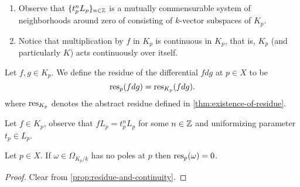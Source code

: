 \begin{remark}\label{rem:mutually-commensurable-system}
\begin{enumerate}[label = (\alph*)]
	\item Observe that $\{t_{p}^{n}L_{p}\}_{n\in {\mathbb Z}}$ is a mutually commensurable system of neighborhoods around zero of consisting of $k$-vector subspaces of $K_{p}$. 
	\item Notice that multiplication by $f$ in $K_{p}$ is continuous in $K_{p}$, that is, $K_{p}$ (and particularly $K$) acts continuously over itself.
\end{enumerate}
\begin{definition}\label{def:residue-at-p}
	Let $f,g \in K_{p}$. We define the residue of the differential $fdg$ at $p\in X$ to be
	\[
		\operatorname{res}_{p}(fdg) = \operatorname{res}_{K_{p}}(fdg).
	\]
	where $\operatorname{res}_{K_{p}}$ denotes the abstract residue defined in \cref{thm:existence-of-residue}.
\end{definition}

\end{remark}
Let $f\in K_{p}$, observe that $fL_{p} = t_{p}^{n}L_{p}$ for some $n \in {\mathbb Z}$ and uniformizing parameter $t_{p} \in L_{p}$. 
\begin{proposition}\label{prop:no-poles-zero-residue}
	Let $p\in X$. If $\omega \in \Omega_{K_{p}/k}$ has no poles at $p$ then $\operatorname{res}_{p}(\omega) = 0$.
\end{proposition}
\begin{proof}
	Clear from \cref{prop:residue-and-continuity}.
\end{proof}

